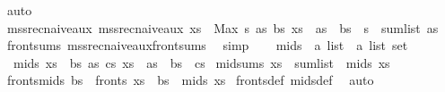 \begin{isabellebody}
\ auto%
\endisatagproof
{\isafoldproof}%
%
\isadelimproof
\isanewline
%
\endisadelimproof
\isanewline
{}\isamarkupfalse%
\ mss{\isacharunderscore}{\kern0pt}rec{\isacharunderscore}{\kern0pt}naive{\isacharunderscore}{\kern0pt}aux{\isacharcolon}{\kern0pt}\ {\isachardoublequoteopen}mss{\isacharunderscore}{\kern0pt}rec{\isacharunderscore}{\kern0pt}naive{\isacharunderscore}{\kern0pt}aux\ xs\ {\isacharequal}{\kern0pt}\ Max\ {\isacharbraceleft}{\kern0pt}s{\isachardot}{\kern0pt}\ {\isasymexists}as\ bs{\isachardot}{\kern0pt}\ xs\ {\isacharequal}{\kern0pt}\ as\ {\isacharat}{\kern0pt}\ bs\ {\isasymand}\ s\ {\isacharequal}{\kern0pt}\ sum{\isacharunderscore}{\kern0pt}list\ as{\isacharbraceright}{\kern0pt}{\isachardoublequoteclose}\isanewline
%
\isadelimproof
%
\endisadelimproof
%
\isatagproof
{}\isamarkupfalse%
\ front{\isacharunderscore}{\kern0pt}sums\ mss{\isacharunderscore}{\kern0pt}rec{\isacharunderscore}{\kern0pt}naive{\isacharunderscore}{\kern0pt}aux{\isacharunderscore}{\kern0pt}front{\isacharunderscore}{\kern0pt}sums\ \isamarkupfalse%
\ simp%
\endisatagproof
{\isafoldproof}%
%
\isadelimproof
\isanewline
%
\endisadelimproof
\ \ \isanewline
\isanewline
{}\isamarkupfalse%
\ mids\ {\isacharcolon}{\kern0pt}{\isacharcolon}{\kern0pt}\ {\isachardoublequoteopen}{\isacharprime}{\kern0pt}a\ list\ {\isasymRightarrow}\ {\isacharprime}{\kern0pt}a\ list\ set{\isachardoublequoteclose}\ \isanewline
\ \ {\isachardoublequoteopen}mids\ xs\ {\isasymequiv}\ {\isacharbraceleft}{\kern0pt}bs{\isachardot}{\kern0pt}\ {\isasymexists}as\ cs{\isachardot}{\kern0pt}\ xs\ {\isacharequal}{\kern0pt}\ as\ {\isacharat}{\kern0pt}\ bs\ {\isacharat}{\kern0pt}\ cs{\isacharbraceright}{\kern0pt}{\isachardoublequoteclose}\isanewline
\isanewline
{}\isamarkupfalse%
\ {\isachardoublequoteopen}mid{\isacharunderscore}{\kern0pt}sums\ xs\ {\isasymequiv}\ sum{\isacharunderscore}{\kern0pt}list\ {\isacharbackquote}{\kern0pt}\ mids\ xs{\isachardoublequoteclose}\isanewline
\isanewline
{}\isamarkupfalse%
\ fronts{\isacharunderscore}{\kern0pt}mids{\isacharcolon}{\kern0pt}\ {\isachardoublequoteopen}bs\ {\isasymin}\ fronts\ xs\ {\isasymLongrightarrow}\ bs\ {\isasymin}\ mids\ xs{\isachardoublequoteclose}\isanewline
%
\isadelimproof
%
\endisadelimproof
%
\isatagproof
{}\isamarkupfalse%
\ fronts{\isacharunderscore}{\kern0pt}def\ mids{\isacharunderscore}{\kern0pt}def\ \isamarkupfalse%
\ auto%
\endisatagproof
{\isafoldproof}%
%
\isadelimproof
\isanewline
%
\endisadelimproof

\end{isabellebody}
